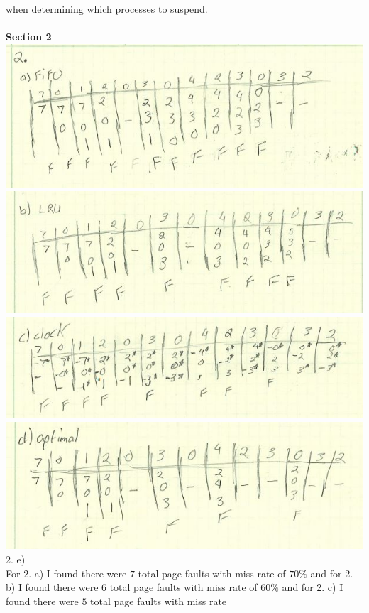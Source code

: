 \documentclass[12pt]{article}
\begin{document}
when determining which processes to suspend.\\\\
\textbf{Section 2}\\
\includegraphics[scale = 1]{2a.JPG}\\
\includegraphics[scale = 1]{2b.JPG}\\
\includegraphics[scale = 1]{2c.JPG}\\
\includegraphics[scale = 1]{2d.JPG}\\
2. e) \\
For 2. a) I found there were $7$ total page faults with miss rate 
of $70\%$ and for 2. b) I found there were $6$ total page faults with miss rate 
of $60\%$ and for 2. c) I found there were $5$ total page faults with miss rate 
\end{document}
